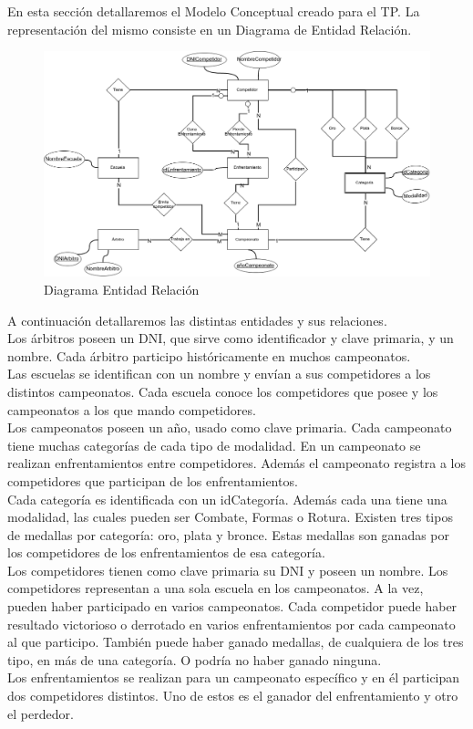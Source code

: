 En esta sección detallaremos el Modelo Conceptual creado para el TP. La representación del mismo consiste en un Diagrama
de Entidad Relación.

\begin{figure}[H]
  \centering
    \includegraphics[scale=0.4]{imagenes/DER.png}
  \caption{Diagrama Entidad Relación}
\end{figure}

A continuación detallaremos las distintas entidades y sus relaciones.\\

Los árbitros poseen un DNI, que sirve como identificador y clave primaria, y un nombre. Cada árbitro participo históricamente
en muchos campeonatos.\\

Las escuelas se identifican con un nombre y envían a sus competidores a los distintos campeonatos. Cada escuela conoce los competidores
que posee y los campeonatos a los que mando competidores.\\

Los campeonatos poseen un año, usado como clave primaria. Cada campeonato tiene muchas categorías de cada tipo de modalidad.
En un campeonato se realizan enfrentamientos entre competidores. Además el campeonato registra a los competidores que
participan de los enfrentamientos.\\

Cada categoría es identificada con un idCategoría. Además cada una tiene una modalidad, las cuales pueden ser
Combate, Formas o Rotura. Existen tres tipos de medallas por categoría: oro, plata y bronce. Estas medallas son ganadas
por los competidores de los enfrentamientos de esa categoría.\\

Los competidores tienen como clave primaria su DNI y poseen un nombre. Los competidores representan a una sola escuela en
los campeonatos. A la vez, pueden haber participado en varios campeonatos. Cada competidor puede haber resultado victorioso
o derrotado en varios enfrentamientos por cada campeonato al que participo. También puede haber ganado medallas, de
cualquiera de los tres tipo, en más de una categoría. O podría no haber ganado ninguna.\\

Los enfrentamientos se realizan para un campeonato específico y en él participan dos competidores distintos. Uno de estos
es el ganador del enfrentamiento y otro el perdedor.
